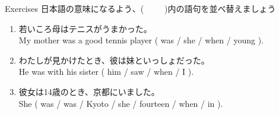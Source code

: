\documentclass[aspectratio=169,xcolor={dvipsnames,table}]{beamer}
\begin{document}
\begin{frame}[plain]{Exercises}
日本語の意味になるよう、(~~~~~)内の語句を並べ替えましょう

\begin{enumerate}
 \item 若いころ母はテニスがうまかった。\\
       My mother was a good tennis player ( was / she / when / young ).\\
 \item わたしが見かけたとき、彼は妹といっしょだった。\\
       He was with his sister ( him / saw / when / I ). \\
 \item  彼女は14歳のとき、京都にいました。\\
	She ( was / was / Kyoto / she / fourteen / when / in ).\\
\end{enumerate}
\end{frame}
\end{document}

